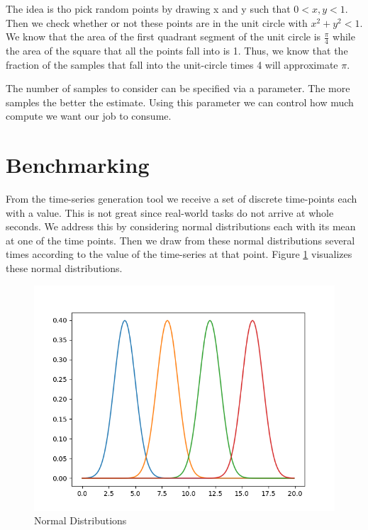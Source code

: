The idea is tho pick random points by drawing x and y such that $0 < x, y < 1$. Then we check whether or not these points are in the unit circle with $x^2 + y^2 < 1$. We know that the area of the first quadrant segment of the unit circle is $\frac{\pi}{4}$ while the area of the square that all the points fall into is 1. Thus, we know that the fraction of the samples that fall into the unit-circle times 4 will approximate $\pi$.

The number of samples to consider can be specified via a parameter. The more samples the better the estimate. Using this parameter we can control how much compute we want our job to consume. 

\section{Benchmarking}

From the time-series generation tool we receive a set of discrete time-points each with a value. This is not great since real-world tasks do not arrive at whole seconds. We address this by considering normal distributions each with its mean at one of the time points. Then we draw from these normal distributions several times according to the value of the time-series at that point. Figure \ref{fig:normal-dists} visualizes these normal distributions.

\begin{figure}
   \centering
   \includegraphics[scale=0.70]{figures/normal-dists.png}
\caption{Normal Distributions}    
\label{fig:normal-dists}
\end{figure}

